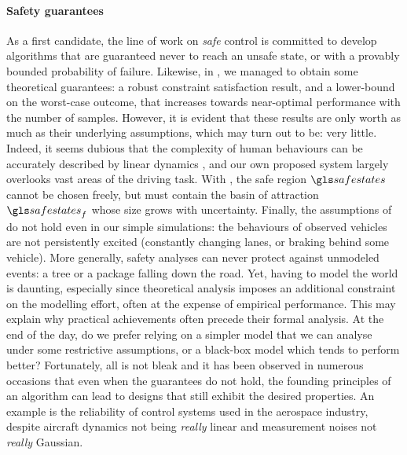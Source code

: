 \paragraph{Safety guarantees}

As a first candidate, the line of work on \emph{safe} control is committed to develop algorithms that are guaranteed never to reach an unsafe state, or with a provably bounded probability of failure. 
Likewise, in , we managed to obtain some theoretical guarantees: a robust constraint satisfaction result, and a lower-bound on the worst-case outcome, that increases towards near-optimal performance with the number of samples. However, it is evident that these results are only worth as much as their underlying assumptions, which may turn out to be: very little. Indeed, it seems dubious that the complexity of human behaviours can be accurately described by linear dynamics , and our own proposed system largely overlooks vast areas of the driving task. With , the safe region $\safestates$ cannot be chosen freely, but must contain the basin of attraction $\safestates_{f}$ whose size grows with uncertainty. Finally, the assumptions of  do not hold even in our simple simulations: the behaviours of observed vehicles are not persistently excited (\ie constantly changing lanes, or braking behind some vehicle). More generally, safety analyses can never protect against unmodeled events: a tree or a package falling down the road. Yet, having to model the world is daunting, especially since theoretical analysis imposes an additional constraint on the modelling effort, often at the expense of empirical performance. This may explain why practical achievements often precede their formal analysis. At the end of the day, do we prefer relying on a simpler model that we can analyse under some restrictive assumptions, or a black-box model which tends to perform better? Fortunately, all is not bleak and it has been observed in numerous occasions that even when the guarantees do not hold, the founding principles of an algorithm can lead to designs that still exhibit the desired properties. An example is the reliability of control systems used in the aerospace industry, despite aircraft dynamics not being \emph{really} linear and measurement noises not \emph{really} Gaussian.



